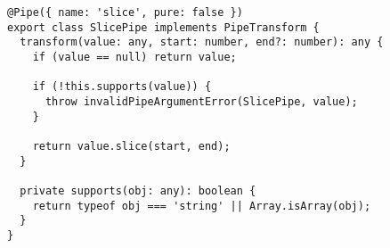 \begin{verbatim}
@Pipe({ name: 'slice', pure: false })
export class SlicePipe implements PipeTransform {
  transform(value: any, start: number, end?: number): any {
    if (value == null) return value;

    if (!this.supports(value)) {
      throw invalidPipeArgumentError(SlicePipe, value);
    }

    return value.slice(start, end);
  }

  private supports(obj: any): boolean {
    return typeof obj === 'string' || Array.isArray(obj);
  }
}
\end{verbatim}
